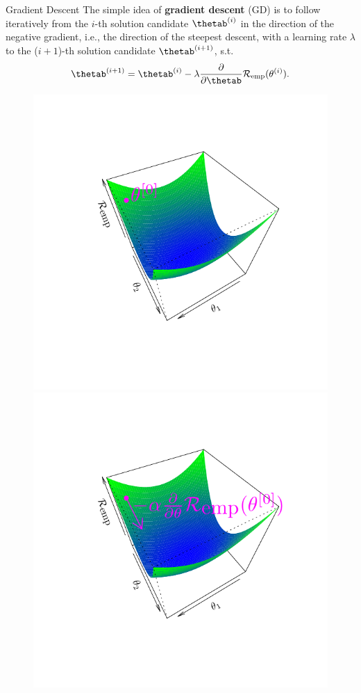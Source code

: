 \documentclass[11pt,compress,t,notes=noshow, xcolor=table]{beamer}
\begin{document}
\begin{vbframe}{Gradient Descent}
The simple idea of \textbf{gradient descent} (GD) is to follow iteratively from the $i$-th solution candidate $\thetab^{(i)}$ in the direction of the negative gradient, i.e., the direction of the steepest descent, with a learning rate $\lambda$ to the ($i+1$)-th solution candidate $\thetab^{(i+1)}$, s.t.
\[
\thetab^{(i+1)} = \thetab^{(i)} - \lambda \frac{\partial}{\partial\thetab}{\riske(\theta^{(i)})}.
\]

\begin{figure}[!htb]
  \includegraphics[trim=2cm 2cm 2cm 2cm, width=\linewidth]{figure/grad_desc1}  
\endminipage\hfill
{}
  \includegraphics[trim=2cm 2cm 2cm 2cm, width=\linewidth]{figure/grad_desc2}

\end{figure}
\end{vbframe}
\end{document}
